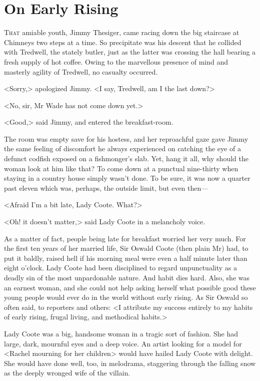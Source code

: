\chapter{On Early Rising}

\lettrine{T}{hat} amiable youth, Jimmy Thesiger, came racing down the big staircase at Chimneys two steps at a time. So precipitate was his descent that he collided with Tredwell, the stately butler, just as the latter was crossing the hall bearing a fresh supply of hot coffee. Owing to the marvellous presence of mind and masterly agility of Tredwell, no casualty occurred.

<Sorry,> apologized Jimmy. <I say, Tredwell, am I the last down?>

<No, sir, Mr Wade has not come down yet.>

<Good,> said Jimmy, and entered the breakfast-room.

The room was empty save for his hostess, and her reproachful gaze gave Jimmy the same feeling of discomfort he always experienced on catching the eye of a defunct codfish exposed on a fishmonger's slab. Yet, hang it all, why should the woman look at him like that? To come down at a punctual nine-thirty when staying in a country house simply wasn't done. To be sure, it was now a quarter past eleven which was, perhaps, the outside limit, but even then—

<Afraid I'm a bit late, Lady Coote. What?>

<Oh! it doesn't matter,> said Lady Coote in a melancholy voice.

As a matter of fact, people being late for breakfast worried her very much. For the first ten years of her married life, Sir Oswald Coote (then plain Mr) had, to put it baldly, raised hell if his morning meal were even a half minute later than eight o'clock. Lady Coote had been disciplined to regard unpunctuality as a deadly sin of the most unpardonable nature. And habit dies hard. Also, she was an earnest woman, and she could not help asking herself what possible good these young people would ever do in the world without early rising. As Sir Oswald so often said, to reporters and others: <I attribute my success entirely to my habits of early rising, frugal living, and methodical habits.>

Lady Coote was a big, handsome woman in a tragic sort of fashion. She had large, dark, mournful eyes and a deep voice. An artist looking for a model for <Rachel mourning for her children> would have hailed Lady Coote with delight. She would have done well, too, in melodrama, staggering through the falling snow as the deeply wronged wife of the villain.

